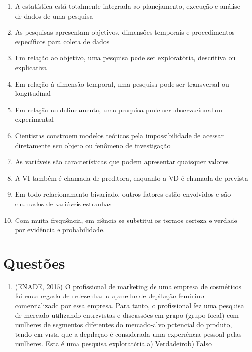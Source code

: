 \documentclass[
]{book}
\providecommand{\tightlist}{%
  \setlength{\itemsep}{0pt}\setlength{\parskip}{0pt}}
\begin{document}
\begin{enumerate}
\def\labelenumi{\arabic{enumi}.}
\tightlist
\item
  A estatística está totalmente integrada ao planejamento, execução e análise de dados de uma pesquisa\\
\item
  As pesquisas apresentam objetivos, dimensões temporais e procedimentos específicos para coleta de dados\\
\item
  Em relação ao objetivo, uma pesquisa pode ser exploratória, descritiva ou explicativa\\
\item
  Em relação à dimensão temporal, uma pesquisa pode ser transversal ou longitudinal\\
\item
  Em relação ao delineamento, uma pesquisa pode ser observacional ou experimental\\
\item
  Cientistas constroem modelos teóricos pela impossibilidade de acessar diretamente seu objeto ou fenômeno de investigação\\
\item
  As variáveis são características que podem apresentar quaisquer valores\\
\item
  A VI também é chamada de preditora, enquanto a VD é chamada de prevista\\
\item
  Em todo relacionamento bivariado, outros fatores estão envolvidos e são chamados de variáveis estranhas\\
\item
  Com muita frequência, em ciência se substitui os termos certeza e verdade por evidência e probabilidade.
\end{enumerate}

\hypertarget{questuxf5es}{%
\section{Questões}\label{questuxf5es}}

\begin{enumerate}
\def\labelenumi{\arabic{enumi}.}
\tightlist
\item
  (ENADE, 2015) O profissional de marketing de uma empresa de cosméticos foi encarregado de redesenhar o aparelho de depilação feminino comercializado por essa empresa. Para tanto, o profissional fez uma pesquisa de mercado utilizando entrevistas e discussões em grupo (grupo focal) com mulheres de segmentos diferentes do mercado-alvo potencial do produto, tendo em vista que a depilação é considerada uma experiência pessoal pelas mulheres. Esta é uma pesquisa exploratória.a) Verdadeirob) Falso
\end{enumerate}
\end{document}
